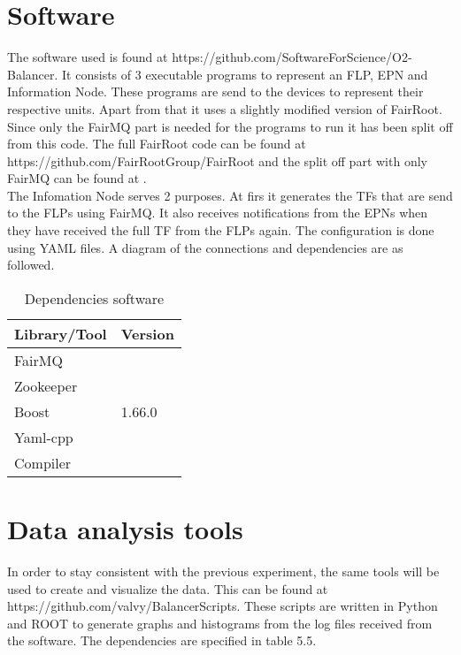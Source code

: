 \section{Software}
The software used is found at https://github.com/SoftwareForScience/O2-Balancer. It consists of 3 executable programs to represent an FLP, EPN and Information Node. These programs are send to the devices to represent their respective units. Apart from that it uses a slightly modified version of FairRoot. Since only the FairMQ part is needed for the programs to run it has been split off from this code. The full FairRoot code can be found at \\ 
https://github.com/FairRootGroup/FairRoot and the split off part with only FairMQ can be found at
. \\ 
The Infomation Node serves 2 purposes. At firs it generates the TFs that are send to the FLPs using FairMQ. It also receives notifications from the EPNs when they have received the full TF from the FLPs again. The configuration is done using YAML files. A diagram of the connections and dependencies are as followed.


\begin{table}[htb]
\begin{tabular}{| l | l |}
\hline
Library/Tool & Version \\ \hline
FairMQ & \\ \hline
Zookeeper & \\ \hline
Boost & 1.66.0 \\ \hline
Yaml-cpp & \\ \hline
Compiler & \\ \hline
\end{tabular}
\caption{Dependencies software}
\end{table}

\section{Data analysis tools}
In order to stay consistent with the previous experiment, the same tools will be used to create and visualize the data. This can be found at \\ https://github.com/valvy/BalancerScripts. These scripts are written in Python and ROOT to generate graphs and histograms from the log files received from the software. The dependencies are specified in table 5.5.

